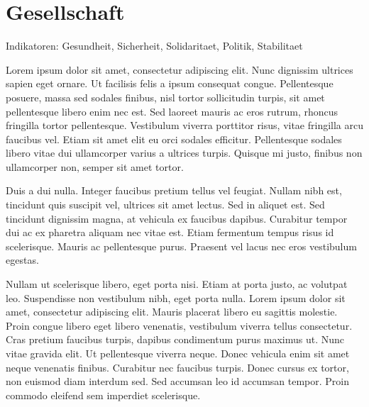 \section{Gesellschaft}\label{sec:conflict}

Indikatoren: Gesundheit, Sicherheit, Solidaritaet, Politik, Stabilitaet

Lorem ipsum dolor sit amet, consectetur adipiscing elit. Nunc dignissim ultrices sapien eget ornare. Ut facilisis felis a ipsum consequat congue. Pellentesque posuere, massa sed sodales finibus, nisl tortor sollicitudin turpis, sit amet pellentesque libero enim nec est. Sed laoreet mauris ac eros rutrum, rhoncus fringilla tortor pellentesque. Vestibulum viverra porttitor risus, vitae fringilla arcu faucibus vel. Etiam sit amet elit eu orci sodales efficitur. Pellentesque sodales libero vitae dui ullamcorper varius a ultrices turpis. Quisque mi justo, finibus non ullamcorper non, semper sit amet tortor.

Duis a dui nulla. Integer faucibus pretium tellus vel feugiat. Nullam nibh est, tincidunt quis suscipit vel, ultrices sit amet lectus. Sed in aliquet est. Sed tincidunt dignissim magna, at vehicula ex faucibus dapibus. Curabitur tempor dui ac ex pharetra aliquam nec vitae est. Etiam fermentum tempus risus id scelerisque. Mauris ac pellentesque purus. Praesent vel lacus nec eros vestibulum egestas.

Nullam ut scelerisque libero, eget porta nisi. Etiam at porta justo, ac volutpat leo. Suspendisse non vestibulum nibh, eget porta nulla. Lorem ipsum dolor sit amet, consectetur adipiscing elit. Mauris placerat libero eu sagittis molestie. Proin congue libero eget libero venenatis, vestibulum viverra tellus consectetur. Cras pretium faucibus turpis, dapibus condimentum purus maximus ut. Nunc vitae gravida elit. Ut pellentesque viverra neque. Donec vehicula enim sit amet neque venenatis finibus. Curabitur nec faucibus turpis. Donec cursus ex tortor, non euismod diam interdum sed. Sed accumsan leo id accumsan tempor. Proin commodo eleifend sem imperdiet scelerisque.
